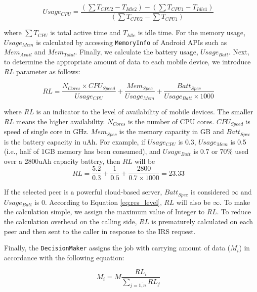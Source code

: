 \documentclass{sig-alternate}[10pt]
\begin{document}
\begin{equation}
\label{eq:cpu_usage}
Usage_{CPU} = \frac{(\sum{T_{CPU2}} - T_{Idle2}) - (\sum{T_{CPU1}} - T_{Idle1})}{(\sum{T_{CPU2}} - \sum{T_{CPU1}})}
\end{equation}

\noindent where $\sum{T_{CPU}}$ is total active time and $T_{Idle}$ is idle time. For the memory usage, $Usage_{Mem}$ is calculated by accessing \texttt{MemoryInfo} of Android APIs such as $Mem_{Avail}$ and $Mem_{Total}$. Finally, we  calculate the battery usage, $Usage_{Batt}$. Next, to determine the appropriate amount of data to each mobile device, we introduce $RL$ parameter as follows:

\begin{equation}
\label{eq:res_level}
RL = \frac{N_{Cores} \times CPU_{Speed}}{Usage_{CPU}} + \frac{Mem_{Spec}}{Usage_{Mem}} + \frac{Batt_{Spec}}{Usage_{Batt} \times 1000}
\end{equation}

\noindent where $RL$ is an indicator to the level of availability of mobile devices. The smaller $RL$ means the higher availability. $N_{Cores}$ is the number of CPU cores. $CPU_{Speed}$ is speed of single core in GHz. $Mem_{Spec}$ is the memory capacity in GB and $Batt_{Spec}$ is the battery capacity in uAh. For example, if $Usage_{CPU}$ is 0.3, $Usage_{Mem}$ is 0.5 (i.e., half of 1GB memory has been consumed), and $Usage_{Batt}$ is 0.7 or 70\% used over a 2800uAh capacity battery, then $RL$ will be $$RL = \frac{5.2}{0.3} + \frac{1}{0.5} + \frac{2800}{0.7 \times 1000} = 23.33$$

If the selected peer is a powerful cloud-based server, $Batt_{Spec}$ is considered $\infty$ and $Usage_{Batt}$ is 0. According to Equation \ref{eq:res_level}, $RL$ will also be $\infty$. To make the calculation simple, we assign the maximum value of Integer to $RL$. To reduce the calculation overhead on the calling side, $RL$ is prematurely calculated on each peer and then sent to the caller in response to the IRS request.

Finally, the \texttt{DecisionMaker} assigns the job with carrying amount of data ($M_{i}$) in accordance with the following equation:

\begin{equation} 
\label{eq:data_amount}
M_{i} = M\frac{RL_{i}}{\sum_{j = \overline{1,n}}{RL_{j}}}
\end{equation}
\end{document}
